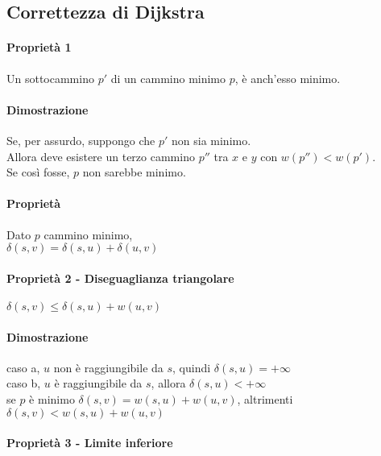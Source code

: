 \subsection{Correttezza di Dijkstra}

\paragraph{Proprietà 1}

Un sottocammino $p'$ di un cammino minimo $p$, è anch'esso minimo.

\paragraph{Dimostrazione}

Se, per assurdo, suppongo che $p'$ non sia minimo.\\
Allora deve esistere un terzo cammino $p''$ tra $x$ e $y$ con $w(p'') < w(p')$.\\
Se così fosse, $p$ non sarebbe minimo.

\paragraph{Proprietà}

Dato $p$ cammino minimo, \\
$\delta(s,v)=\delta(s,u)+\delta(u,v)$ \\


\paragraph{Proprietà 2 - Diseguaglianza triangolare}

$\delta(s,v)\leq \delta(s,u)+w(u,v)$ \\

\paragraph{Dimostrazione}

caso a, $u$ non è raggiungibile da $s$, quindi $\delta(s,u) = +\infty$ \\
caso b, $u$ è raggiungibile da $s$, allora $\delta(s,u) < +\infty$ \\

se $p$ è minimo $\delta(s,v)=w(s,u)+w(u,v)$, altrimenti $\delta(s,v)<w(s,u)+w(u,v)$ \\


\paragraph{Proprietà 3 - Limite inferiore}

